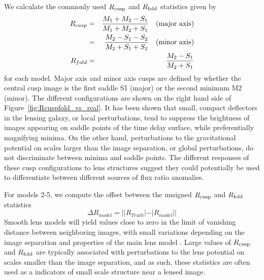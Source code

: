 \noindent We calculate the commonly used $R_{\rm{cusp}}$ and $R_{\rm{fold}}$ statistics given by
%
\begin{eqnarray} \label{eq:rcuspfold1}
R_{cusp} &=& \dfrac{M_{1} + M_{2} - S_{1}}{M_{1} + M_{2} + S_{1}} \quad \rm{(major \ axis)} \\ \nonumber &=& \dfrac{M_2 - S_{1} - S_{2}}{M_{2} + S_{1} + S_{2}} \quad \rm{(minor \ axis)} \\\label{eq:rcuspfold2}R_{fold} &=& \frac{M_{2} - S_{1}}{M_{2} + S_{1}}
\end{eqnarray}
for each model. Major axis and minor axis cusps are defined by whether the central cusp image is the first saddle S1 (major) or the second minimum M2 (minor). The different configurations are shown on the right hand side of Figure~\ref{fig:Rcuspfold_vs_real}. It has been shown \cite[see][]{Schechter:2002p699,Kee03a} that small, compact deflectors in the lensing galaxy, or local perturbations, tend to suppress the brightness of images appearing on saddle points of the time delay surface, while preferentially magnifying minima. On the other hand, perturbations to the gravitational potential on scales larger than the image separation, or global perturbations, do not discriminate between minima and saddle points. The different responses of these cusp configurations to lens structures suggest they could potentially be used to differentiate between different sources of flux ratio anomalies.

For models 2-5, we compute the offset between the unsigned $R_{\rm{cusp}}$ and $R_{\rm{fold}}$ statistics
\begin{equation}
\nonumber \Delta R_{model} = ||R_{Truth}|- |R_{model}|| 
\end{equation}
Smooth lens models will yield values close to zero in the limit of vanishing distance between neighboring images, with small variations depending on the image separation and properties of the main lens model \cite[see][]{KGP03,Keeton:2005p591}. Large values of $R_{\rm{cusp}}$ and $R_{\rm{fold}}$ are typically associated with perturbations to the lens potential on scales smaller than the image separation, and as such, these statistics are often used as a indicators of small scale structure near a lensed image.
